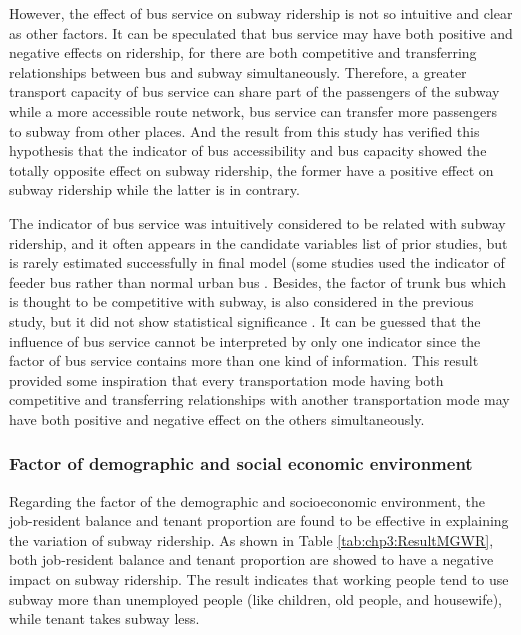 %
However, the effect of bus service on subway ridership is not so intuitive and clear as other factors. It can be speculated that bus service may have both positive and negative effects on ridership, for there are both competitive and transferring relationships between bus and subway simultaneously. Therefore, a greater transport capacity of bus service can share part of the passengers of the subway while a more accessible route network, bus service can transfer more passengers to subway from other places. And the result from this study has verified this hypothesis that the indicator of bus accessibility and bus capacity showed the totally opposite effect on subway ridership, the former have a positive effect on subway ridership while the latter is in contrary. 

%
The indicator of bus service was intuitively considered to be related with subway ridership, and it often appears in the candidate variables list of prior studies, but is rarely estimated successfully in final model (some studies used the indicator of feeder bus rather than normal urban bus \cite{sohn2010factors,cardozo2012application,zhao2013influences}. Besides, the factor of trunk bus which is thought to be competitive with subway, is also considered in the previous study, but it did not show statistical significance \cite{sohn2010factors}. It can be guessed that the influence of bus service cannot be interpreted by only one indicator since the factor of bus service contains more than one kind of information. This result provided some inspiration that every transportation mode having both competitive and transferring relationships with another transportation mode may have both positive and negative effect on the others simultaneously.

%
\subsubsection{Factor of demographic and social economic environment}
%
Regarding the factor of the demographic and socioeconomic environment, the job-resident balance and tenant proportion are found to be effective in explaining the variation of subway ridership. As shown in Table \ref{tab:chp3:ResultMGWR}, both job-resident balance and tenant proportion are showed to have a negative impact on subway ridership. The result indicates that working people tend to use subway more than unemployed people (like children, old people, and housewife), while tenant takes subway less.

